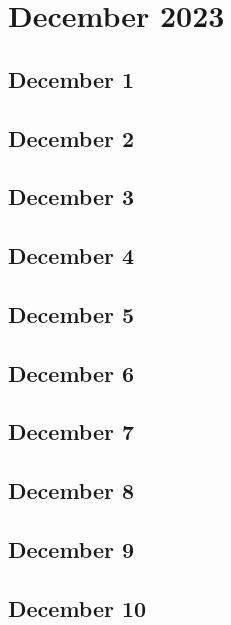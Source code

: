 %
%
%

\chapter{December 2023}
\label{intro} %

\section{December 1}

\section{December 2}

\section{December 3}

\section{December 4}

\section{December 5}

\section{December 6}

\section{December 7}

\section{December 8}

\section{December 9}

\section{December 10}

